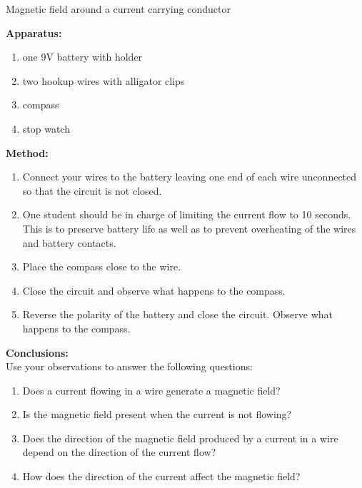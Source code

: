 \begin{g_experiment}{Magnetic field around a current carrying conductor}{
\textbf{Apparatus: } 
\begin{enumerate}
\item one 9V battery with holder
\item two hookup wires with alligator clips
\item compass
\item stop watch
\end{enumerate}
\textbf{Method: }
\begin{enumerate}
\item Connect your wires to the battery leaving one end of each wire unconnected so that the circuit is not closed.
\item One student should be in charge of limiting the current flow to 10 seconds. This is to preserve battery life as well as to prevent overheating of the wires and battery contacts.
\item Place the compass close to the wire.
\item Close the circuit and observe what happens to the compass.
\item Reverse the polarity of the battery and close the circuit. Observe what happens to the compass.
\end{enumerate}
\textbf{Conclusions: }\\
Use your observations to answer the following questions:
\begin{enumerate}
\item Does a current flowing in a wire generate a magnetic field?
\item Is the magnetic field present when the current is not flowing?
\item Does the direction of the magnetic field produced by a current in a wire depend on the direction of the current flow?
\item How does the direction of the current affect the magnetic field?
\end{enumerate}
}
\end{g_experiment}
